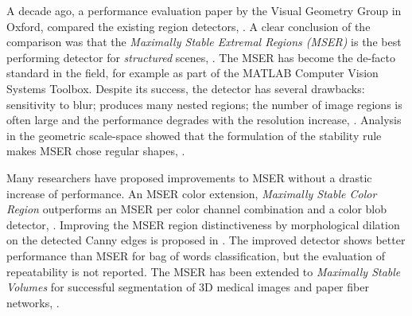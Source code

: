 \documentclass{article}
\begin{document}
A decade ago, a performance evaluation paper by the Visual Geometry Group in Oxford, compared the existing region detectors, \cite{Mikolajczyk:2005}. 
A clear conclusion of the comparison was that the {\em  Maximally Stable Extremal Regions (MSER)} is the best performing detector for {\em structured} scenes, \cite{Matas2002BMVC}. The MSER has become the de-facto standard in the field, for example as part of the MATLAB Computer Vision Systems Toolbox. Despite its success, the detector has several drawbacks: sensitivity to blur; produces many nested regions; the number of image regions is often large and the performance degrades with the resolution increase, \cite{CorRos2013}. Analysis in the geometric scale-space showed that the formulation of the stability rule makes MSER chose regular shapes, \cite{Kimmel11}.

Many researchers have proposed improvements to MSER without a drastic increase of performance. An MSER color extension, {\em Maximally Stable Color Region} outperforms an  MSER per color channel combination and a color blob detector, \cite{Forssen07}. 
Improving the MSER region distinctiveness by morphological dilation on the detected Canny edges is proposed in \cite{Wang14}. The improved detector shows better performance than MSER for bag of words classification, but the evaluation of repeatability is not reported. 
The MSER has been extended to {\em Maximally Stable Volumes} for successful segmentation of 3D medical images and paper fiber networks, \cite{DonoserB06}.
\end{document}
